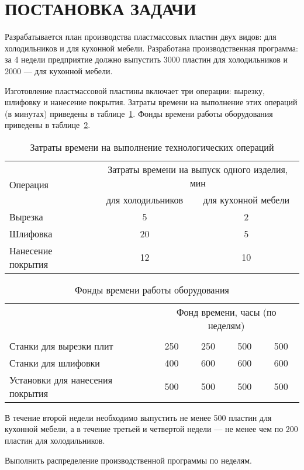 \section{ПОСТАНОВКА ЗАДАЧИ}

Разрабатывается план производства пластмассовых пластин двух видов:
для холодильников и для кухонной мебели.
Разработана производственная программа: за 4 недели предприятие должно
выпустить 3000 пластин для холодильников и 2000 --- для кухонной мебели.

Изготовление пластмассовой пластины включает три операции:
вырезку, шлифовку и нанесение покрытия. 
Затраты времени на выполнение этих операций (в минутах) приведены в 
таблице~\ref{tbl:timers}. 
Фонды времени работы оборудования приведены в таблице~\ref{tbl:time_available}.

\begin{table} [h!]
  \caption{
    Затраты времени на выполнение технологических операций
  }\label{tbl:timers}
  \begin{tabular}{| m{4.9cm} | c | c |}
    \hline
    \multirow{2}{*}{Операция}
    & \multicolumn{2}{c|}{Затраты времени на выпуск одного изделия, мин} 
    \\ \cline{2-3}

    & для холодильников
    & для кухонной мебели \\
    \hline

    Вырезка
    & 5
    & 2 \\
    \hline

    Шлифовка
    & 20
    & 5 \\
    \hline

    Нанесение покрытия
    & 12
    & 10 \\
    \hline
      
  \end{tabular}
\end{table}

\vspace{-4mm}

\begin{table} [h!]
  \caption{
    Фонды времени работы оборудования
  }\label{tbl:time_available}
  \begin{tabular}{| m{8cm} | c | c | c | c |}
    \hline
    \multirow{2}{*}{}
    & \multicolumn{4}{c|}{Фонд времени, часы (по неделям)} 
    \\ \cline{2-5}

    & \parbox{1.5cm}{}
    & \parbox{1.5cm}{}
    & \parbox{1.5cm}{}
    & \parbox{1.5cm}{} \\
    \hline

    Станки для вырезки плит
    & 250
    & 250
    & 500
    & 500 \\
    \hline

    Станки для шлифовки
    & 400
    & 600
    & 600
    & 600 \\
    \hline

    Установки для нанесения покрытия
    & 500
    & 500
    & 500
    & 500 \\
    \hline      
  \end{tabular}
\end{table}

В течение второй недели необходимо выпустить не менее 500 пластин для кухонной мебели,
а в течение третьей и четвертой недели --- не менее чем по 200 пластин для холодильников.

Выполнить распределение производственной программы по неделям.